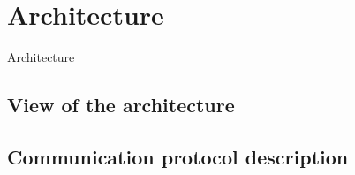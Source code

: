 \chapter{Architecture}
\label{Architecture}

Architecture

\section{View of the architecture}
\section{Communication protocol description}